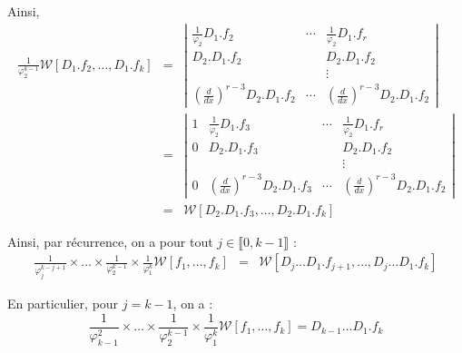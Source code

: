 Ainsi,
\begin{eqnarray*}
  \frac{1}{\varphi^{k - 1}_2} \mathcal{W} [D_1 .f_2, \ldots, D_1 .f_k] & = &
  \left| \begin{array}{ccc}
    \frac{1}{\varphi_2} D_1 .f_2 & \cdots & \frac{1}{\varphi_2} D_1 .f_r\\
    D_2 .D_1 .f_2 &  & D_2 .D_1 .f_2\\
    &  & \vdots\\
    \left( \frac{d}{d x} \right)^{r - 3} D_2 .D_1 .f_2 & \cdots & \left(
    \frac{d}{d x} \right)^{r - 3} D_2 .D_1 .f_2
  \end{array} \right|\\
  & = & \left| \begin{array}{cccc}
    1 & \frac{1}{\varphi_2} D_1 .f_3 & \cdots & \frac{1}{\varphi_2} D_1 .f_r\\
    0 & D_2 .D_1 .f_3 &  & D_2 .D_1 .f_2\\
    &  &  & \vdots\\
    0 & \left( \frac{d}{d x} \right)^{r - 3} D_2 .D_1 .f_3 & \cdots & \left(
    \frac{d}{d x} \right)^{r - 3} D_2 .D_1 .f_2
  \end{array} \right|\\
  & = & \mathcal{W} [D_2 .D_1 .f_3, \ldots, D_2 .D_1 .f_k]
\end{eqnarray*}

Ainsi, par r{\'e}currence, on a pour tout $j \in \llbracket 0, k - 1
\rrbracket$ :
\begin{eqnarray*}
  \frac{1}{\varphi^{k - j + 1}_j} \times \ldots \times \frac{1}{\varphi^{k -
  1}_2} \times \frac{1}{\varphi^k_1} \mathcal{W} [f_1, \ldots, f_k] & = &
  \mathcal{W} [D_j \ldots D_1 .f_{j + 1}, \ldots, D_j \ldots D_1 .f_k]
\end{eqnarray*}


En particulier, pour $j = k - 1$, on a :
\[ \frac{1}{\varphi^2_{k - 1}} \times \ldots \times \frac{1}{\varphi^{k -
   1}_2} \times \frac{1}{\varphi^k_1} \mathcal{W} [f_1, \ldots, f_k] = D_{k -
   1} \ldots D_1 .f_k \]

